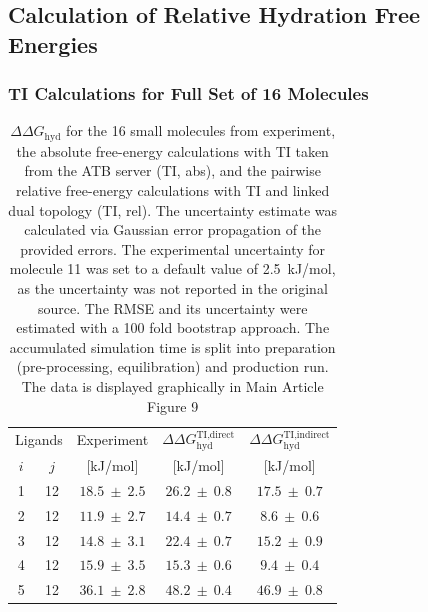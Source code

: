 \subsection{Calculation of Relative Hydration Free Energies}
\subsubsection{TI Calculations for Full Set of 16 Molecules}

\begin{table}[H]
\caption{$\Delta \Delta G_\text{hyd}$ for the 16 small molecules from experiment, the absolute free-energy calculations with TI taken from the ATB server\cite{Stroet2018} (TI, abs), and the pairwise relative free-energy calculations with TI and linked dual topology (TI, rel).
The uncertainty estimate was calculated via Gaussian error propagation of the provided errors. The experimental uncertainty for molecule 11 was set to a default value of 2.5~kJ/mol\cite{Mobley2014}, as the uncertainty was not reported in the original source\cite{Wolfenden1987}. The RMSE and its uncertainty were estimated with a 100 fold bootstrap approach. The accumulated simulation time is split into preparation (pre-processing, equilibration) and production run. The data is displayed graphically in Main Article Figure 9}
\begin{center}
\footnotesize
\begin{tabular}{ | c c |c |c|c|}
\hline
  \multicolumn{2}{|c|}{Ligands} & \multicolumn{1}{c|}{Experiment} &\multicolumn{1}{c|}{$\Delta\Delta G_\text{hyd}^\text{TI,direct}$}&\multicolumn{1}{c|}{$\Delta\Delta G_\text{hyd}^\text{TI,indirect}$}\\ 
    $i$ & $j$ & [kJ/mol] & [kJ/mol] & [kJ/mol]  \\
  \hline \hline
        1 &  12 &  $18.5 ~\pm~ 2.5$ \cite{Guthrie2014,Rizzo2006}&  $26.2 ~\pm~ 0.8$ &  $  17.5 ~\pm~ 0.7$\\
        2 &  12 &  $11.9 ~\pm~ 2.7$ \cite{Guthrie2014,Rizzo2006}  &  $14.4 ~\pm~ 0.7$ &  $  8.6 ~\pm~ 0.6 $\\
        3 &  12 &  $14.8 ~\pm~ 3.1$ \cite{Guthrie2014,Rizzo2006}  &  $22.4 ~\pm~ 0.7$ &  $ 15.2 ~\pm~ 0.9 $\\
        4 &  12 &  $15.9 ~\pm~ 3.5$ \cite{Rizzo2006} &  $15.3 ~\pm~ 0.6$ &  $  9.4 ~\pm~ 0.4 $\\
        5 &  12 &   $36.1 ~\pm~ 2.8$ \cite{Guthrie2014,Rizzo2006}  &  $48.2 ~\pm~ 0.4$ &  $ 46.9 ~\pm~ 0.8 $\\

\end{tabular}
\end{center}
\end{table}
